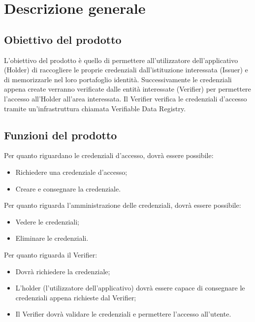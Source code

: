 \section{Descrizione generale}

\subsection{Obiettivo del prodotto}
L’obiettivo del prodotto è quello di permettere all’utilizzatore dell’applicativo (Holder) di raccogliere le proprie credenziali dall’istituzione interessata (Issuer) e di 
memorizzarle nel loro portafoglio identità. Successivamente le credenziali appena create verranno verificate dalle entità interessate (Verifier) per permettere l’accesso 
all'Holder all’area interessata. Il Verifier verifica le credenziali d’accesso tramite un’infrastruttura chiamata Verifiable Data Registry.

\subsection{Funzioni del prodotto}
Per quanto riguardano le credenziali d’accesso, dovrà essere possibile: 
\begin{itemize}
    \item Richiedere una credenziale d’accesso;
    \item Creare e consegnare la credenziale.
\end{itemize}
Per quanto riguarda l’amministrazione delle credenziali, dovrà essere possibile: 
\begin{itemize}
    \item Vedere le credenziali;
    \item Eliminare le credenziali.
\end{itemize}
Per quanto riguarda il Verifier: 
\begin{itemize}
    \item Dovrà richiedere la credenziale;
    \item L'holder (l’utilizzatore dell’applicativo) dovrà essere capace di consegnare le credenziali appena richieste dal Verifier;
    \item Il Verifier dovrà validare le credenziali e permettere l’accesso all’utente.
\end{itemize}


